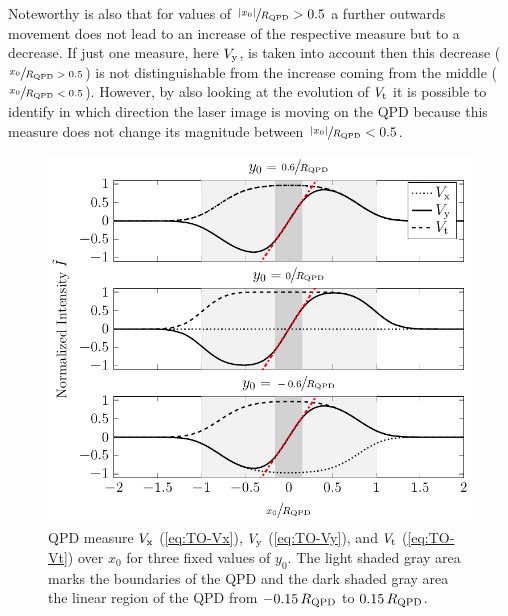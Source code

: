 Noteworthy is also that for values of $\sfrac{\abs{x_{0}}}{R_{\mathrm{QPD}}} > 0.5$ 
a further outwards movement does not lead to an increase of the respective 
measure but to a decrease. If just one measure, here $V_{\mathrm{y}}$, is taken 
into account then this decrease ($\sfrac{x_{0}}{R_{\mathrm{QPD}} > 0.5}$) is not 
distinguishable from the increase coming from the middle 
($\sfrac{x_{0}}{R_{\mathrm{QPD}} < 0.5}$). However, by also looking at the 
evolution of $V_{\mathrm{t}}$ it is possible to identify in which direction the 
laser image is moving on the QPD because this measure does not change its 
magnitude between $\sfrac{\abs{x_{0}}}{R_{\mathrm{QPD}}} < 0.5$.

\begin{figure}[tbp]
  \centering
  \includegraphics[]{Plots/cache/voltages_over_x.pdf}
  \caption{QPD measure $V_{\mathrm{x}}$ (\cref{eq:TO-Vx}), $V_{\mathrm{y}}$
    (\cref{eq:TO-Vy}), and $V_{\mathrm{t}}$ (\cref{eq:TO-Vt}) over $x_{0}$ for 
  three fixed values of $y_{0}$. The light shaded gray area marks the 
boundaries of the QPD and the dark shaded gray area the linear region of the 
QPD from $-0.15\,R_{\mathrm{QPD}}$ to $0.15\,R_{\mathrm{QPD}}$.}
  \label{fig:TO-voltages_over_x}
\end{figure}
